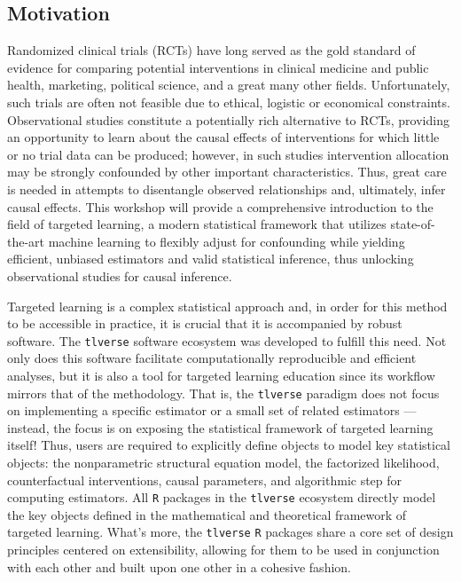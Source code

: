 \documentclass[a4paper,11pt]{texMemo}
\begin{document}
\subsection{Motivation}

Randomized clinical trials (RCTs) have long served as the gold standard of
evidence for comparing potential interventions in clinical medicine and public
health, marketing, political science, and a great many other fields.
Unfortunately, such trials are often not feasible due to ethical, logistic or
economical constraints. Observational studies constitute a potentially rich
alternative to RCTs, providing an opportunity to learn about the causal effects
of interventions for which little or no trial data can be produced; however, in
such studies intervention allocation may be strongly confounded by other
important characteristics. Thus, great care is needed in attempts to disentangle
observed relationships and, ultimately, infer causal effects. This workshop will
provide a comprehensive introduction to the field of targeted learning, a modern
statistical framework that utilizes state-of-the-art machine learning to
flexibly adjust for confounding while yielding efficient, unbiased estimators
and valid statistical inference, thus unlocking observational studies for causal
inference.

Targeted learning is a complex statistical approach and, in order for this
method to be accessible in practice, it is crucial that it is accompanied by
robust software. The \texttt{tlverse} software ecosystem was developed to
fulfill this need. Not only does this software facilitate computationally
reproducible and efficient analyses, but it is also a tool for targeted learning
education since its workflow mirrors that of the methodology. That is, the
\texttt{tlverse} paradigm does not focus on implementing a specific estimator or
a small set of related estimators --- instead, the focus is on exposing the
statistical framework of targeted learning itself! Thus, users are required to
explicitly define objects to model key statistical objects: the nonparametric
structural equation model, the factorized likelihood, counterfactual
interventions, causal parameters, and algorithmic step for computing estimators.
All \texttt{R} packages in the \texttt{tlverse} ecosystem directly model the key
objects defined in the mathematical and theoretical framework of targeted
learning. What's more, the \texttt{tlverse} \texttt{R} packages share a core set
of design principles centered on extensibility, allowing for them to be used in
conjunction with each other and built upon one other in a cohesive fashion.
\end{document}
